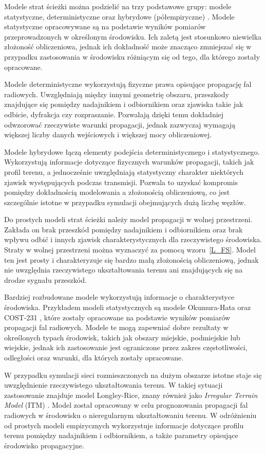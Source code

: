 \documentclass[12pt,a4paper,twoside]{report}
\theoremstyle{definition} %
\begin{document}
Modele strat ścieżki można podzielić na trzy podstawowe grupy: modele statystyczne, deterministyczne oraz hybrydowe (półempiryczne) \cite{neskovic2000}. Modele statystyczne opracowywane są na podstawie wyników pomiarów przeprowadzonych w określonym środowisku. Ich zaletą jest stosunkowo niewielka złożoność obliczeniowa, jednak ich dokładność może znacząco zmniejszać się w przypadku zastosowania w środowisku różniącym się od tego, dla którego zostały opracowane.

Modele deterministyczne wykorzystują fizyczne prawa opisujące propagację fal radiowych. Uwzględniają między innymi geometrię obszaru, przeszkody znajdujące się pomiędzy nadajnikiem i odbiornikiem oraz zjawiska takie jak odbicie, dyfrakcja czy rozpraszanie. Pozwalają dzięki temu dokładniej odwzorować rzeczywiste warunki propagacji, jednak zazwyczaj wymagają większej liczby danych wejściowych i większej mocy obliczeniowej.

Modele hybrydowe łączą elementy podejścia deterministycznego i statystycznego. Wykorzystują informacje dotyczące fizycznych warunków propagacji, takich jak profil terenu, a jednocześnie uwzględniają statystyczny charakter niektórych zjawisk występujących podczas transmisji. Pozwala to uzyskać kompromis pomiędzy dokładnością modelowania a złożonością obliczeniową, co jest szczególnie istotne w przypadku symulacji obejmujących dużą liczbę węzłów.

Do prostych modeli strat ścieżki należy model propagacji w wolnej przestrzeni. Zakłada on brak przeszkód pomiędzy nadajnikiem i odbiornikiem oraz brak wpływu odbić i innych zjawisk charakterystycznych dla rzeczywistego środowiska. Straty w wolnej przestrzeni można wyznaczyć za pomocą wzoru~\eqref{L_FS}. Model ten jest prosty i charakteryzuje się bardzo małą złożonością obliczeniową, jednak nie uwzględnia rzeczywistego ukształtowania terenu ani znajdujących się na drodze sygnału przeszkód.

Bardziej rozbudowane modele wykorzystują informacje o charakterystyce środowiska. Przykładem modeli statystycznych są modele Okumura-Hata \cite{okumura1968,hata1980} oraz COST-231 \cite{cost231}, które zostały opracowane na podstawie wyników pomiarów propagacji fal radiowych. Modele te mogą zapewniać dobre rezultaty w określonych typach środowisk, takich jak obszary miejskie, podmiejskie lub wiejskie, jednak ich zastosowanie jest ograniczone przez zakres częstotliwości, odległości oraz warunki, dla których zostały opracowane.

W przypadku symulacji sieci rozmieszczonych na dużym obszarze istotne staje się uwzględnienie rzeczywistego ukształtowania terenu. W takiej sytuacji zastosowanie znajduje model Longley-Rice, znany również jako \textit{Irregular Terrain Model} (ITM) \cite{longley1968}. Model został opracowany w celu prognozowania propagacji fal radiowych w środowisku o nieregularnym ukształtowaniu terenu. W odróżnieniu od prostych modeli empirycznych wykorzystuje informacje dotyczące profilu terenu pomiędzy nadajnikiem i odbiornikiem, a także parametry opisujące środowisko propagacyjne.
\end{document}

